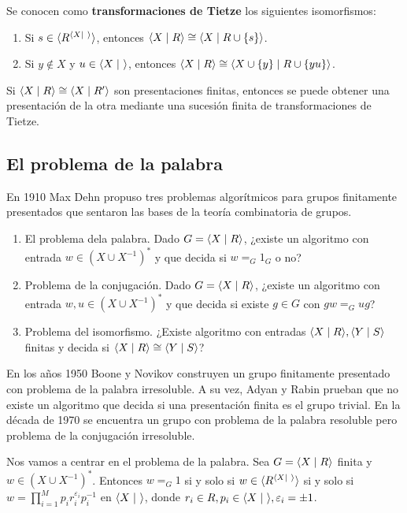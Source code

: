 \documentclass[twoside, 11pt]{article}
\begin{document}
Se conocen como \textbf{transformaciones de Tietze} los siguientes isomorfismos:
\begin{enumerate}
\item Si $s\in \gene{R^{\gene{X\mid\ }}}$, entonces $\langle{X\mid R}\rangle\cong\langle{X\mid R\cup\{s\}}\rangle$.
\item Si $y\notin X$ y $u\in\langle{X\mid\ }\rangle$, entonces $\langle{X\mid R}\rangle\cong \langle{X\cup \{y\}\mid R\cup \{yu\}}\rangle$.
\end{enumerate}

\begin{teorema}
Si $\langle{X\mid R}\rangle\cong\langle{X\mid R'}\rangle$ son presentaciones finitas, entonces se puede obtener una presentación de la otra mediante una sucesión finita de transformaciones de Tietze.
\end{teorema}

\subsection{El problema de la palabra}
En 1910 Max Dehn propuso tres problemas algorítmicos para grupos finitamente presentados que sentaron las bases de la teoría combinatoria de grupos. 
\begin{enumerate}
\item El problema dela palabra. Dado $G=\langle{X\mid R}\rangle$, ¿existe un algoritmo con entrada $w\in (X\cup X^{-1})^*$ y que decida si $w=_G1_G$ o no?
\item Problema de la conjugación. Dado $G=\langle{X\mid R}\rangle$, ¿existe un algoritmo con entrada $w,u\in (X\cup X^{-1})^*$ y que decida si existe $g\in G$ con $gw=_G ug$?
\item Problema del isomorfismo. ¿Existe algoritmo con entradas $\langle{X\mid R}\rangle, \langle{Y\mid S}\rangle$ finitas y decida si $\langle{X\mid R}\rangle\cong \langle{Y\mid S}\rangle$?
\end{enumerate}

En los años 1950 Boone y Novikov construyen un grupo finitamente presentado con problema de la palabra irresoluble. A su vez, Adyan y Rabin prueban que no existe un algoritmo que decida si una presentación finita es el grupo trivial. En la década de 1970 se encuentra un grupo con problema de la palabra resoluble pero problema de la conjugación irresoluble. 

Nos vamos a centrar en el problema de la palabra. Sea $G=\langle{X\mid R}\rangle$ finita y $w\in (X\cup X^{-1})^*$. Entonces $w=_G 1$ si y solo si $w\in \gene{R^{\gene{X\mid\ }}}$ si y solo si $w=\displaystyle\prod_{i=1}^M p_ir_i^{\varepsilon_i}p_i^{-1}$ en $\langle{X\mid\ }\rangle$, donde $r_i\in R, p_i\in\langle{X\mid\ }\rangle, \varepsilon_i=\pm 1$.
\end{document}
